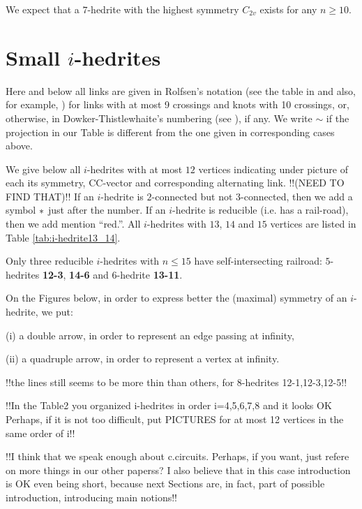 \documentclass[12pt]{article}
\begin{document}
We expect that a $7$-hedrite with the highest symmetry $C_{2v}$ 
exists for any $n\geq 10$.







\section{Small $i$-hedrites}

Here and below all links are given 
in Rolfsen's notation (see the table in \cite{Rolf} and also,  
for example, \cite{Kaw}) for links with at most 9 
crossings and knots with 10 crossings, or, otherwise, in
Dowker-Thistlewhaite's numbering (see \cite{T}), if any.
We write $\sim$ if the projection in our Table is different 
from the one given in corresponding cases above.

We give below all $i$-hedrites with at most $12$ vertices indicating under 
picture of each its symmetry, CC-vector and corresponding alternating link.
!!(NEED TO FIND THAT)!!
If an $i$-hedrite is $2$-connected but not $3$-connected, then we add
a symbol ${\bf *}$ just after the number. If an $i$-hedrite is reducible
(i.e. has a rail-road), then we add mention ``red.''. All $i$-hedrites
with $13$, $14$ and $15$ vertices are listed in Table
\ref{tab:i-hedrite13_14}.

Only three reducible $i$-hedrites with $n \leq 15$ have self-intersecting
railroad: $5$-hedrites {\bf 12-3}, {\bf 14-6} and $6$-hedrite {\bf 13-11}.


On the Figures below, in order to express better the (maximal)
symmetry of an $i$-hedrite, we put:

(i) a double arrow, in order to represent an edge passing at infinity,

(ii) a quadruple arrow, in order to represent a vertex at infinity.

!!the lines still seems to be more thin than others, for 8-hedrites
12-1,12-3,12-5!!

!!In the Table2 you organized i-hedrites in order i=4,5,6,7,8 and it looks OK
Perhaps, if it is not too difficult, put PICTURES for at most 12 vertices
in the same order of i!!

!!I think that we speak enough about c.circuits. Perhaps, if you want, just
refere on more things in our other paperss?
I also believe that in this case introduction is OK even being short,
because next Sections are, in fact, part of possible introduction,
introducing main notions!!
\end{document}

